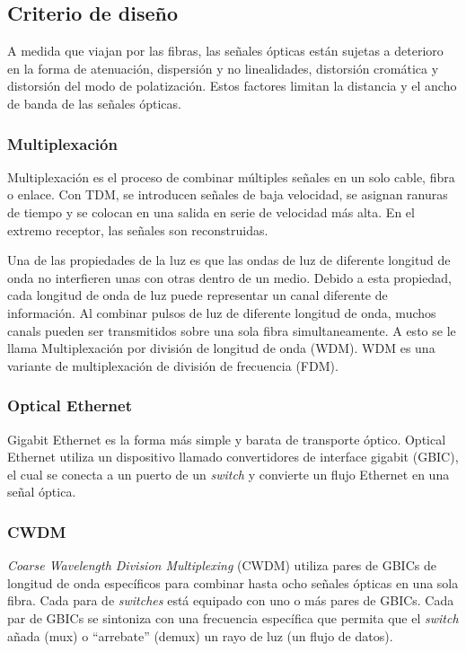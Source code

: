 \documentclass[10pt,journal,compsoc]{IEEEtran}
\begin{document}
\subsection{Criterio de diseño}
A medida que viajan por las fibras, las señales ópticas están sujetas a deterioro en la forma de atenuación, dispersión y no linealidades, distorsión cromática y distorsión del modo de polatización. Estos factores limitan la distancia y el ancho de banda de las señales ópticas. 

\subsubsection{Multiplexación}
Multiplexación es el proceso de combinar múltiples señales en un solo cable, fibra o enlace. Con TDM, se introducen señales de baja velocidad, se asignan ranuras de tiempo y se colocan en una salida en serie de velocidad más alta. En el extremo receptor, las señales son reconstruidas.


Una de las propiedades de la luz es que las ondas de luz de diferente longitud de onda no interfieren unas con otras dentro de un medio. Debido a esta propiedad, cada longitud de onda de luz puede representar un canal diferente de información. Al combinar pulsos de luz de diferente longitud de onda, muchos canals pueden ser transmitidos sobre una sola fibra simultaneamente. A esto se le llama Multiplexación por división de longitud de onda (WDM). WDM es una variante de multiplexación de división de frecuencia (FDM).

\subsubsection{Optical Ethernet}
Gigabit Ethernet es la forma más simple y barata de transporte óptico. Optical Ethernet utiliza un dispositivo llamado convertidores de interface gigabit (GBIC), el cual se conecta a un puerto de un \emph{switch} y convierte un flujo Ethernet en una señal óptica.

\subsubsection{CWDM}
\emph{Coarse Wavelength Division Multiplexing} (CWDM) utiliza pares de GBICs de longitud de onda específicos para combinar hasta ocho señales ópticas en una sola fibra. Cada para de \emph{switches} está equipado con uno o más pares de GBICs. Cada par de GBICs se sintoniza con una frecuencia específica que permita que el \emph{switch} añada (mux) o ``arrebate'' (demux) un rayo de luz (un flujo de datos).
\end{document}
